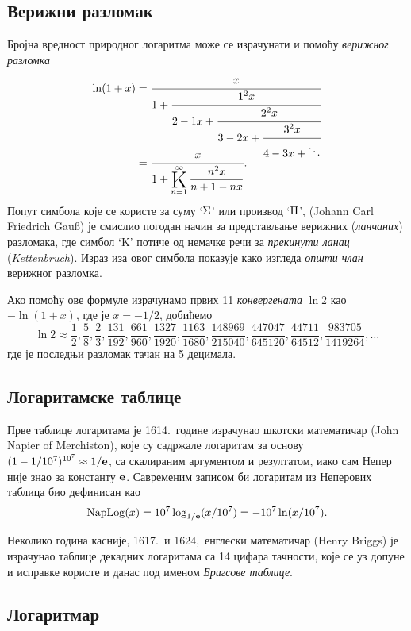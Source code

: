 \subsection{Верижни разломак}

Бројна вредност природног логаритма може се израчунати и помоћу {\sl верижног разломка}
\begin{equation}\label{eq:verige}
\begin{aligned}
\ln(1+x)
&=\cfrac{x}{1+\cfrac{1^2x}{2-1x+\cfrac{2^2x}{3-2x+\cfrac{3^2x}{4-3x+\ddots}}}}\\
\noalign{\vskip-12pt}
&=\cfrac{x}{1+ \Kinf{\n^2x}{\n+1-\n x}}.
\end{aligned}
\end{equation}
Попут симбола које се користе за суму `$\rm\Sigma$' или производ `$\rm\Pi$', 
 (Johann Carl Friedrich Gau\ss) је смислио погодан начин за представљање
верижних ({\sl ланчаних\/}) разломака,
где симбол `K' потиче од немачке речи за {\sl прекинути ланац\/} ({\sl Kettenbruch\/}).
Израз иза овог симбола показује како изгледа {\sl општи члан\/} верижног разломка.

\def\ff#1/#2,{\frac{#1}{#2},}
Ако помоћу ове формуле израчунамо првих 11 {\sl конвергената\/} $\ln2$ као $-\ln(1+x)$, 
где је $x=-1/2$,
добићемо
$$
\ln2\approx\ff1/2, \ff5/8, \ff2/3, \ff131/192, \ff661/960, \ff1327/1920, \ff1163/1680, \ff148969/215040, 
\ff447047/645120, \ff44711/64512, \ff983705/1419264, \dots
$$
где је последњи разломак тачан на 5 децимала.


\subsection{Логаритамске таблице}

Прве таблице логаритама је 1614.\ године 
израчунао шкотски математичар  (John Napier of Merchiston),
које су садржале логаритам за основу $(1-1/10^7)^{10^7} \approx1/{\bf e}$, 
са скалираним аргументом и резултатом,
иако сам Непер није знао за константу ${\bf e}$.
Савременим записом би логаритам из Неперових таблица био дефинисан као
$$
\mathop{\rm NapLog}\nolimits (x) = 10^7\log_{1/{\bf e}}(x/10^7) = -10^7\ln(x/10^7).
$$

Неколико година касније, 1617.\ и 1624,\ 
енглески математичар  (Henry Briggs) је израчунао
таблице декадних логаритама са 14 цифара тачности, које се уз допуне и исправке
користе и данас под именом {\sl Бригсове таблице}.


\subsection{Логаритмар}

